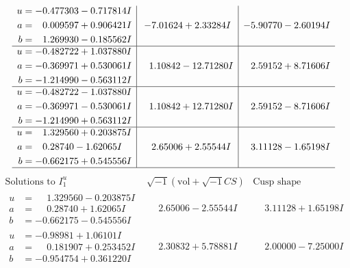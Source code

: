 \documentclass[1p]{elsarticle_modified}
\theoremstyle{definition}
\newcommand{\I}{\sqrt{-1}}
\begin{document}
$$\begin{array}{c|c|c}
\begin{aligned}
u &= -0.477303 - 0.717814 I \\
a &= \phantom{-}0.009597 + 0.906421 I \\
b &= \phantom{-}1.269930 - 0.185562 I\end{aligned}
 & -7.01624 + 2.33284 I & -5.90770 - 2.60194 I \\ \hline\begin{aligned}
u &= -0.482722 + 1.037880 I \\
a &= -0.369971 + 0.530061 I \\
b &= -1.214990 - 0.563112 I\end{aligned}
 & \phantom{-}1.10842 - 12.71280 I & \phantom{-}2.59152 + 8.71606 I \\ \hline\begin{aligned}
u &= -0.482722 - 1.037880 I \\
a &= -0.369971 - 0.530061 I \\
b &= -1.214990 + 0.563112 I\end{aligned}
 & \phantom{-}1.10842 + 12.71280 I & \phantom{-}2.59152 - 8.71606 I \\ \hline\begin{aligned}
u &= \phantom{-}1.329560 + 0.203875 I \\
a &= \phantom{-}0.28740 - 1.62065 I \\
b &= -0.662175 + 0.545556 I\end{aligned}
 & \phantom{-}2.65006 + 2.55544 I & \phantom{-}3.11128 - 1.65198 I\\
 \hline 
 \end{array}$$\newpage$$\begin{array}{c|c|c}  
\text{Solutions to }I^u_{1}& \I (\text{vol} + \sqrt{-1}CS) & \text{Cusp shape}\\
 \hline 
\begin{aligned}
u &= \phantom{-}1.329560 - 0.203875 I \\
a &= \phantom{-}0.28740 + 1.62065 I \\
b &= -0.662175 - 0.545556 I\end{aligned}
 & \phantom{-}2.65006 - 2.55544 I & \phantom{-}3.11128 + 1.65198 I \\ \hline\begin{aligned}
u &= -0.98981 + 1.06101 I \\
a &= \phantom{-}0.181907 + 0.253452 I \\
b &= -0.954754 + 0.361220 I\end{aligned}
 & \phantom{-}2.30832 + 5.78881 I & \phantom{-}2.00000 - 7.25000 I \\ \hline\begin{aligned}

\end{aligned}
\end{array}$$
\end{document}
